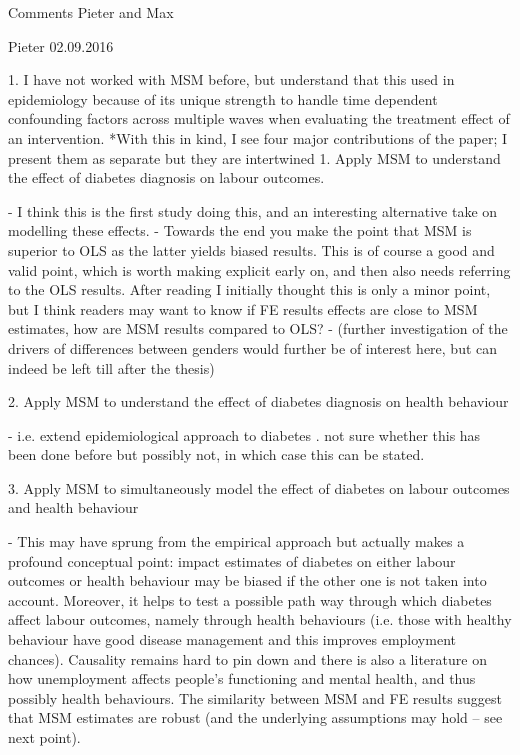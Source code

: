 Comments Pieter and Max

Pieter 02.09.2016

1. I have not worked with MSM before, but understand that this used in epidemiology because of its unique strength to handle time dependent confounding factors across multiple waves when evaluating the treatment effect of an intervention.
*With this in kind, I see four major contributions of the paper; I present them as separate but they are intertwined
1. Apply MSM to understand the effect of diabetes diagnosis on labour outcomes.
 
-          I think this is the first study doing this, and an interesting alternative take on modelling these effects.
-          Towards the end you make the point that MSM is superior to OLS as the latter yields biased results.  This is of course a good and valid point, which is worth making explicit early on, and then also needs referring to the OLS results. After reading I initially thought this is only a minor point, but I think readers may want to know if FE results effects are close to MSM estimates, how are MSM results compared to OLS?
-          (further investigation of the drivers of differences between genders would further be of interest here, but can indeed be left till after the thesis)

2. Apply MSM to understand the effect of diabetes diagnosis on health behaviour
 
-          i.e. extend epidemiological approach to diabetes . not sure whether this has been done before but possibly not, in which case this can be stated.

3. Apply MSM to simultaneously model the effect of diabetes on labour outcomes and health behaviour
 
-          This may have sprung from the empirical approach but actually makes a profound conceptual point: impact estimates of diabetes on either labour outcomes or health behaviour may be biased if the other one is not taken into account. Moreover, it helps to test a possible path way through which diabetes affect labour outcomes, namely through  health behaviours (i.e. those with healthy behaviour have good disease management and this improves employment chances).  Causality remains hard to pin down and there is also a literature on how unemployment affects people’s functioning and mental health, and thus possibly health behaviours.  The similarity between MSM and FE results suggest that MSM estimates are robust (and the underlying assumptions may hold – see next point).

